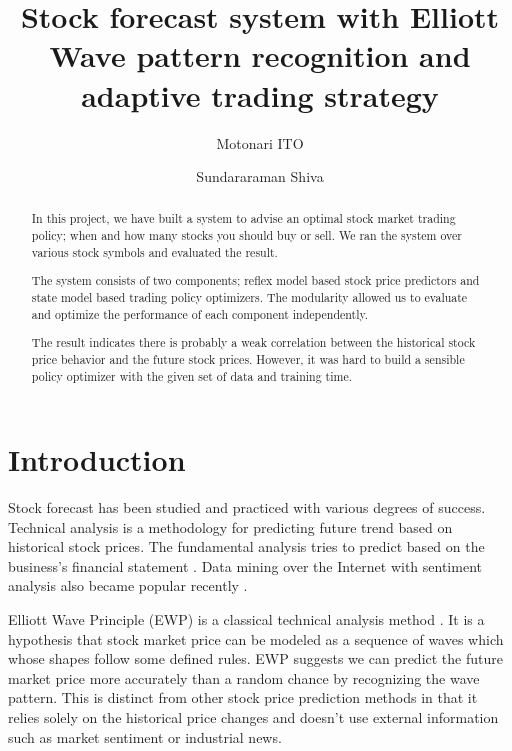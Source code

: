 \documentclass[twocolumn,10pt]{asme2ej}
\begin{document}
\title{Stock forecast system with Elliott Wave pattern recognition and adaptive trading strategy}
\author{Motonari ITO
}

\author{Sundararaman Shiva
}

\maketitle

\begin{abstract}
  In this project, we have built a system to advise an optimal stock market
  trading policy; when and how many stocks you should buy or sell. We ran the
  system over various stock symbols and evaluated the result.

  The system consists of two components; reflex model based stock price
  predictors and state model based trading policy optimizers. The
  modularity allowed us to evaluate and optimize the performance of each
  component independently.
  
  The result indicates there is probably a weak correlation between the
  historical stock price behavior and the future stock prices. However, it was
  hard to build a sensible policy optimizer with the given set of data and
  training time.
\end{abstract}

\section{Introduction}

Stock forecast has been studied and practiced with various degrees of
success. Technical analysis is a methodology for predicting future
trend based on historical stock
prices\cite{wiki:technical_analysis}. The fundamental analysis tries
to predict based on the business's financial statement
\cite{wiki:fundamental_analysis}. Data mining over the Internet with
sentiment analysis also became popular recently
\cite{web:data_mining_analysis}.

Elliott Wave Principle (EWP) is a classical technical analysis method
\cite{frost1981elliott, web:study_of_cycles}. It is a hypothesis that
stock market price can be modeled as a sequence of waves which whose
shapes follow some defined rules. EWP suggests we can predict the
future market price more accurately than a random chance by
recognizing the wave pattern.  This is distinct from other stock price
prediction methods in that it relies solely on the historical price
changes and doesn't use external information such as market sentiment
or industrial news.
\end{document}
